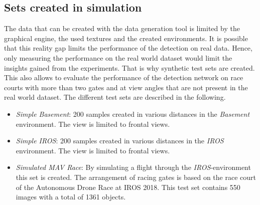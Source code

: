 \subsection{Sets created in simulation}

The data that can be created with the data generation tool is limited by the graphical engine, the used textures and the created environments. It is possible that this reality gap limits the performance of the detection on real data. Hence, only measuring the performance on the real world dataset would limit the insights gained from the experiments. That is why synthetic test sets are created. This also allows to evaluate the performance of the detection network on race courts with more than two gates and at view angles that are not present in the real world dataset.  
The different test sets are described in the following. 

\begin{itemize}
	\item \textit{Simple Basement}: 200 samples created in various distances in the \textit{Basement} environment. The view is limited to frontal views.
	\item \textit{Simple IROS}: 200 samples created in various distances in the \textit{IROS} environment. The view is limited to frontal views.
	\item \textit{Simulated MAV Race}: By simulating a flight through the \textit{IROS}-environment this set is created. 
	The arrangement of racing gates is based on the race court of the Autonomous Drone Race at \ac{IROS} 2018. This test set contains 550 images with a total of 1361 objects.
\end{itemize} 




